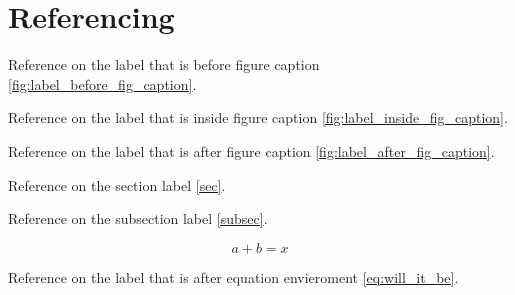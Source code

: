 \documentclass{article}
\begin{document}
\lipsum[17-20]

\section{Referencing}

Reference on the label that is before figure caption \ref{fig:label_before_fig_caption}.

Reference on the label that is inside figure caption \ref{fig:label_inside_fig_caption}.

Reference on the label that is after figure caption \ref{fig:label_after_fig_caption}.

Reference on the section label \ref{sec}.

Reference on the subsection label \ref{subsec}.

\begin{equation}
    a + b = x
\end{equation}\label{eq:will_it_be}

Reference on the label that is after equation envieroment \ref{eq:will_it_be}.
\end{document}
